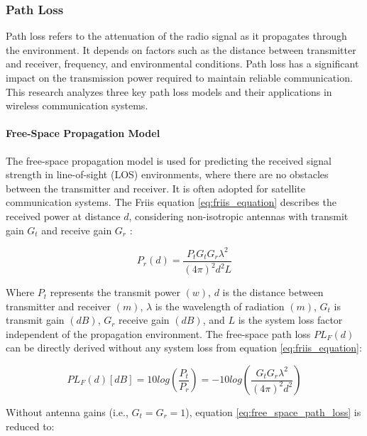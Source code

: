 \subsubsection{Path Loss}

Path loss refers to the attenuation of the radio signal as it propagates through the environment. It depends on factors such as the distance between transmitter and receiver, frequency, and environmental conditions. Path loss has a significant impact on the transmission power required to maintain reliable communication. This research analyzes three key path loss models and their applications in wireless communication systems.

\paragraph{Free-Space Propagation Model}

The free-space propagation model is used for predicting the received signal strength in line-of-sight (LOS) environments, where there are no obstacles between the transmitter and receiver. It is often adopted for satellite communication systems. The Friis equation \ref{eq:friis_equation} describes the received power at distance $d$, considering non-isotropic antennas with transmit gain $G_t$ and receive gain $G_r$ \cite{cho2010mimo}:

\begin{equation}\label{eq:friis_equation}
    P_r\left(d\right)=\frac{P_tG_tG_r\lambda^2}{\left(4\pi\right)^2d^2L}
\end{equation}

Where $P_t$ represents the transmit power $\left(w\right)$, $d$ is the distance between transmitter and receiver $\left(m\right)$, $\lambda$ is the wavelength of radiation $\left(m\right)$, $G_t$ is transmit gain $(dB)$, $G_r$ receive gain $(dB)$, and $L$ is the system loss factor independent of the propagation environment. The free-space path loss ${PL}_F\left(d\right)$ can be directly derived without any system loss from equation \ref{eq:friis_equation}:

\begin{equation}\label{eq:free_space_path_loss}
    PL_F\left(d\right)\left[dB\right]=10log\left(\frac{P_t}{P_r}\right)=-10log\left(\frac{G_tG_r\lambda^2}{\left(4\pi\right)^2d^2}\right)
\end{equation}

Without antenna gains (i.e., $G_t=G_r=1$), equation \ref{eq:free_space_path_loss} is reduced to:

